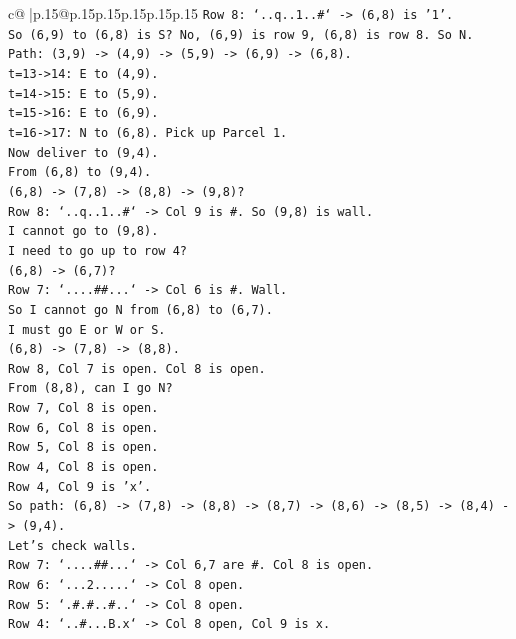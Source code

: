 \documentclass{article}
\begin{document}
{\begin{supertabular}{c@{$\;$}|p{.15\linewidth}@{}p{.15\linewidth}p{.15\linewidth}p{.15\linewidth}p{.15\linewidth}p{.15\linewidth}}
{{{\texttt{Row 8: `..q..1..\#` {-}> (6,8) is '1'.} \\
\texttt{So (6,9) to (6,8) is S? No, (6,9) is row 9, (6,8) is row 8. So N.} \\
\texttt{Path: (3,9) {-}> (4,9) {-}> (5,9) {-}> (6,9) {-}> (6,8).} \\
\texttt{t=13{-}>14: E to (4,9).} \\
\texttt{t=14{-}>15: E to (5,9).} \\
\texttt{t=15{-}>16: E to (6,9).} \\
\texttt{t=16{-}>17: N to (6,8). Pick up Parcel 1.} \\
\texttt{Now deliver to (9,4).} \\
\texttt{From (6,8) to (9,4).} \\
\texttt{(6,8) {-}> (7,8) {-}> (8,8) {-}> (9,8)?} \\
\texttt{Row 8: `..q..1..\#` {-}> Col 9 is \#. So (9,8) is wall.} \\
\texttt{I cannot go to (9,8).} \\
\texttt{I need to go up to row 4?} \\
\texttt{(6,8) {-}> (6,7)?} \\
\texttt{Row 7: `....\#\#...` {-}> Col 6 is \#. Wall.} \\
\texttt{So I cannot go N from (6,8) to (6,7).} \\
\texttt{I must go E or W or S.} \\
\texttt{(6,8) {-}> (7,8) {-}> (8,8).} \\
\texttt{Row 8, Col 7 is open. Col 8 is open.} \\
\texttt{From (8,8), can I go N?} \\
\texttt{Row 7, Col 8 is open.} \\
\texttt{Row 6, Col 8 is open.} \\
\texttt{Row 5, Col 8 is open.} \\
\texttt{Row 4, Col 8 is open.} \\
\texttt{Row 4, Col 9 is 'x'.} \\
\texttt{So path: (6,8) {-}> (7,8) {-}> (8,8) {-}> (8,7) {-}> (8,6) {-}> (8,5) {-}> (8,4) {-}> (9,4).} \\
\texttt{Let's check walls.} \\
\texttt{Row 7: `....\#\#...` {-}> Col 6,7 are \#. Col 8 is open.} \\
\texttt{Row 6: `...2.....` {-}> Col 8 open.} \\
\texttt{Row 5: `.\#.\#..\#..` {-}> Col 8 open.} \\
\texttt{Row 4: `..\#...B.x` {-}> Col 8 open, Col 9 is x.} \\
}}}
\end{supertabular}}
\end{document}
